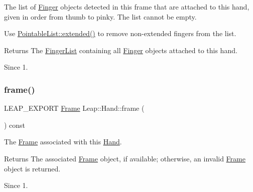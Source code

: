 The list of \hyperlink{class_leap_1_1_finger}{Finger} objects detected in this frame that are attached to this hand, given in order from thumb to pinky. The list cannot be empty.

Use \hyperlink{class_leap_1_1_pointable_list_a47919c7b8198806da5af4c7d351d83fc}{Pointable\+List\+::extended()} to remove non-\/extended fingers from the list.


\begin{DoxyCodeInclude}
\end{DoxyCodeInclude}


\begin{DoxyReturn}{Returns}
The \hyperlink{class_leap_1_1_finger_list}{Finger\+List} containing all \hyperlink{class_leap_1_1_finger}{Finger} objects attached to this hand. 
\end{DoxyReturn}
\begin{DoxySince}{Since}
1. 
\end{DoxySince}
\mbox{\label{class_leap_1_1_hand_abb609377d80becfcaffd5c1ea490f0ea}} 
\subsubsection{\texorpdfstring{frame()}{frame()}}
{\footnotesize\ttfamily L\+E\+A\+P\+\_\+\+E\+X\+P\+O\+RT \hyperlink{class_leap_1_1_frame}{Frame} Leap\+::\+Hand\+::frame (\begin{DoxyParamCaption}{ }\end{DoxyParamCaption}) const}

The \hyperlink{class_leap_1_1_frame}{Frame} associated with this \hyperlink{class_leap_1_1_hand}{Hand}.


\begin{DoxyCodeInclude}
\end{DoxyCodeInclude}


\begin{DoxyReturn}{Returns}
The associated \hyperlink{class_leap_1_1_frame}{Frame} object, if available; otherwise, an invalid \hyperlink{class_leap_1_1_frame}{Frame} object is returned. 
\end{DoxyReturn}
\begin{DoxySince}{Since}
1. 
\end{DoxySince}
\mbox{\label{class_leap_1_1_hand_a8a23340aebe604b2100bd864e8091058}} 
